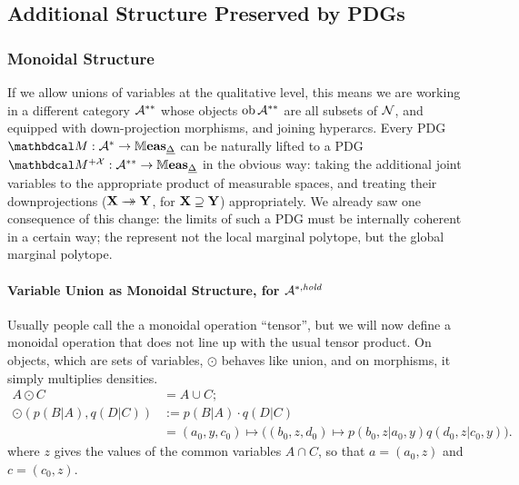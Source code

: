 



\subsection{Additional Structure Preserved by PDGs}
\subsubsection{Monoidal Structure}

If we allow unions of variables at the qualitative level, this means we are working in a different category $\mathcal A^{**}$ whose objects $\operatorname{\mathop{\mathrm{ob}}} \mathcal A^{**}$ are all subsets of $\mathcal N$, and equipped with down-projection morphisms, and joining hyperarcs.
Every PDG $\dg M : \Ar^* \to \Meas_{\underline\Delta}$ can be naturally lifted to a PDG 
$\dg M^{+\X}: \Ar^{**} \to \Meas_{\underline\Delta}$
in the obvious way: taking the additional joint variables to the appropriate product of measurable spaces, and treating their downprojections ($\mathbf X \rightarrow\mathrel{\mspace{-15mu}}\rightarrow \mathbf Y$, for $\mathbf X \supseteq \mathbf Y$) appropriately. 
We already saw one consequence of this change: the limits of such a PDG must be internally coherent in a certain way; the represent not the local marginal polytope, but the global marginal polytope.

\paragraph{Variable Union as Monoidal Structure, for $\mathcal A^{*,\mathit{hold}}$}
Usually people call the a monoidal operation ``tensor'', but we will now define a monoidal operation that does not line up with the usual tensor product. 
On objects, which are sets of variables, $\odot$ behaves like union, and on morphisms, it simply multiplies densities.
\begin{align*}
    A \odot C &= A \cup C; \\
    \odot( p(B|A), q(D|C) )
    &:= p(B|A) \cdot q(D|C)\\
    &= (a_0, y, c_0) \mapsto 
        \Big(
        (b_0, z, d_0) \mapsto p(b_0, z|a_0,y) q(d_0,z|c_0,y)
        \Big).
\end{align*}
where $z$ gives the values of the common variables $A \cap C$, so that $a = (a_0, z)$ and $c = (c_0,z)$.

